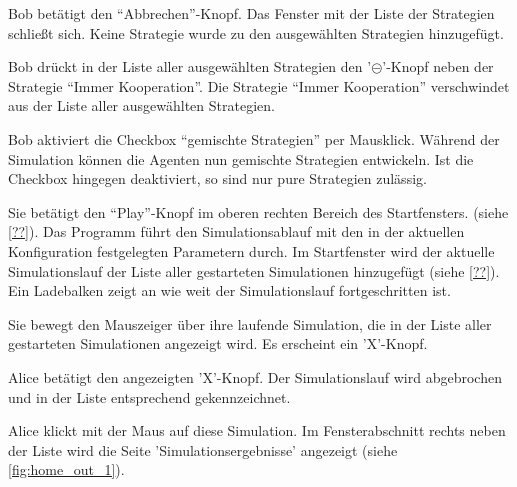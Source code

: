 \documentclass[parskip=full,11pt]{scrartcl}
\begin{document}
{Bob betätigt den \enquote{Abbrechen}-Knopf.}
{Das Fenster mit der Liste der Strategien schließt sich. Keine Strategie wurde zu den ausgewählten Strategien hinzugefügt.}

{Bob drückt in der Liste aller ausgewählten Strategien den '\(\circleddash\)'-Knopf neben der Strategie \enquote{Immer Kooperation}.}
{Die Strategie \enquote{Immer Kooperation} verschwindet aus der Liste aller ausgewählten Strategien.}

{Bob aktiviert die Checkbox \enquote{gemischte Strategien} per Mausklick.}
{Während der Simulation können die Agenten nun gemischte Strategien entwickeln. Ist die Checkbox hingegen deaktiviert, so sind nur pure Strategien zulässig.}


{Sie betätigt den \enquote{Play}-Knopf im oberen rechten Bereich des Startfensters. (siehe \cref{??}).}
{Das Programm führt den Simulationsablauf mit den in der aktuellen Konfiguration festgelegten Parametern durch. Im Startfenster wird der aktuelle Simulationslauf der Liste aller gestarteten Simulationen hinzugefügt (siehe \cref{??}). Ein Ladebalken zeigt an wie weit der Simulationslauf fortgeschritten ist.}

{Sie bewegt den Mauszeiger über ihre laufende Simulation, die in der Liste aller gestarteten Simulationen angezeigt wird.}
{Es erscheint ein 'X'-Knopf.}

{Alice betätigt den angezeigten 'X'-Knopf.}
{Der Simulationslauf wird abgebrochen und in der Liste entsprechend gekennzeichnet.}

{Alice klickt mit der Maus auf diese Simulation.}
{Im Fensterabschnitt rechts neben der Liste wird die Seite 'Simulationsergebnisse' angezeigt (siehe \cref{fig:home_out_1}).}
\end{document}
